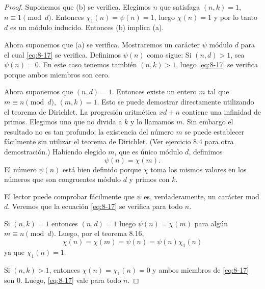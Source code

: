 \documentclass[12pt,a4paper]{book}
\begin{document}
    \begin{proof}
        Suponemos que (b) se verifica. Elegimos $n$ que satisfaga $(n,k)=1$,
        $n\equiv1\pmod{d}$. Entonces $\chi_{1}(n)=\psi(n)=1$, luego $\chi(n)=1$ y por lo tanto
        $d$ es un módulo inducido. Entonces (b) implica (a).

        Ahora suponemos que (a) se verifica. Mostraremos un carácter $\psi$ módulo $d$ para
        el cual \eqref{eq:8-17} se verifica. Definimos $\psi(n)$ como sigue: Si $(n,d)>1$,
        sea $\psi(n)=0$. En este caso tenemos también $(n,k)>1$, luego \eqref{eq:8-17} se
        verifica porque ambos miembros son cero.

        Ahora suponemos que $(n,d)=1$. Entonces existe un entero $m$ tal que
        $m\equiv n\pmod{d}$, $(m,k)=1$. Esto se puede demostrar directamente utilizando el
        teorema de Dirichlet. La progresión aritmética $xd+n$ contiene una infinidad de
        primos. Elegimos uno que no divida a $k$ y lo llamamos $m$. Sin embargo el resultado
        no es tan profundo; la existencia del número $m$ se puede establecer fácilmente sin
        utilizar el teorema de Dirichlet. (Ver ejercicio 8.4 para otra demostración.)
        Habiendo elegido $m$, que es único módulo $d$, definimos
        \begin{equation*}
            \psi(n)=\chi(m).
        \end{equation*}
        El número $\psi(n)$ está bien definido porque $\chi$ toma los mismos valores en los
        números que son congruentes módulo $d$ y primos con $k$.

        El lector puede comprobar fácilmente que $\psi$ es, verdaderamente, un carácter mod
        $d$. Veremos que la ecuación \eqref{eq:8-17} se verifica para todo $n$.

        Si $(n,k)=1$ entonces $(n,d)=1$ luego $\psi(n)=\chi(m)$ para algún
        $m\equiv n\pmod{d}$. Luego, por el teorema 8.16,
        \begin{equation*}
            \chi(n)=\chi(m)=\psi(n)=\psi(n)\chi_{1}(n)
        \end{equation*}
        ya que $\chi_{1}(n)=1$.

        Si $(n,k)>1$, entonces $\chi(n)=\chi_{1}(n)=0$ y ambos miembros de \eqref{eq:8-17} son
        0. Luego, \eqref{eq:8-17} vale para todo $n$.
    \end{proof}
\end{document}
